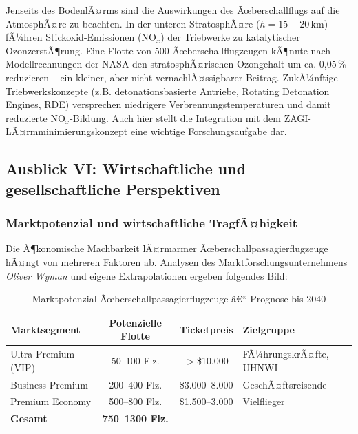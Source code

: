 ﻿\documentclass[12pt,a4paper]{article}
\theoremstyle{definition}
\theoremstyle{remark}
\begin{document}
Jenseits des BodenlÃ¤rms sind die Auswirkungen des Ãœberschallflugs auf die AtmosphÃ¤re
zu beachten. In der unteren StratosphÃ¤re ($h = 15{-}20\,\text{km}$) fÃ¼hren
Stickoxid-Emissionen (NO$_x$) der Triebwerke zu katalytischer OzonzerstÃ¶rung.
Eine Flotte von 500 Ãœberschallflugzeugen kÃ¶nnte nach Modellrechnungen der NASA den
stratosphÃ¤rischen Ozongehalt um ca. 0,05\,\% reduzieren -- ein kleiner, aber nicht
vernachlÃ¤ssigbarer Beitrag. ZukÃ¼nftige Triebwerkskonzepte (z.B. detonationsbasierte
Antriebe, Rotating Detonation Engines, RDE) versprechen niedrigere
Verbrennungstemperaturen und damit reduzierte NO$_x$-Bildung. Auch hier stellt
die Integration mit dem ZAGI-LÃ¤rmminimierungskonzept eine wichtige
Forschungsaufgabe dar.

\subsection{Ausblick VI: Wirtschaftliche und gesellschaftliche Perspektiven}
\label{sec:ausblick_wirtschaft}

\subsubsection{Marktpotenzial und wirtschaftliche TragfÃ¤higkeit}

Die Ã¶konomische Machbarkeit lÃ¤rmarmer Ãœberschallpassagierflugzeuge hÃ¤ngt von mehreren
Faktoren ab. Analysen des Marktforschungsunternehmens \emph{Oliver Wyman} und eigene
Extrapolationen ergeben folgendes Bild:

\begin{table}[H]
  \centering
  \caption{Marktpotenzial Ãœberschallpassagierflugzeuge â€“ Prognose bis 2040}
  \label{tab:markt}
  \begin{tabular}{lccl}
    \toprule
    Marktsegment & Potenzielle Flotte & Ticketpreis & Zielgruppe \\
    \midrule
    Ultra-Premium (VIP) & 50--100 Flz. & $>$\$10.000 & FÃ¼hrungskrÃ¤fte, UHNWI \\
    Business-Premium & 200--400 Flz. & \$3.000--8.000 & GeschÃ¤ftsreisende \\
    Premium Economy & 500--800 Flz. & \$1.500--3.000 & Vielflieger \\
    \textbf{Gesamt} & \textbf{750--1300 Flz.} & -- & -- \\
    \bottomrule
  \end{tabular}
\end{table}
\end{document}
